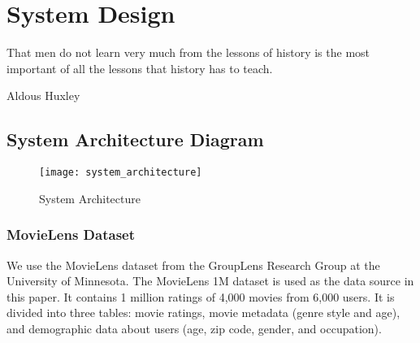 \section{System Design}
\label{ch:system-design}

\epigraph{That men do not learn very much from the lessons of history is the most important of all the lessons that history has to teach.}{Aldous Huxley}

\subsection{System Architecture Diagram}
\begin{figure}[h]
\caption{System Architecture}
\centering
\texttt{[image: system\_architecture]}
\end{figure}
\subsubsection{MovieLens Dataset}
We use the MovieLens dataset from the GroupLens Research Group at the University of Minnesota. The MovieLens 1M dataset is used as the data source in this paper. It contains 1 million ratings of 4,000 movies from 6,000 users. It is divided into three tables: movie ratings, movie metadata (genre style and age), and demographic data about users (age, zip code, gender, and occupation).
